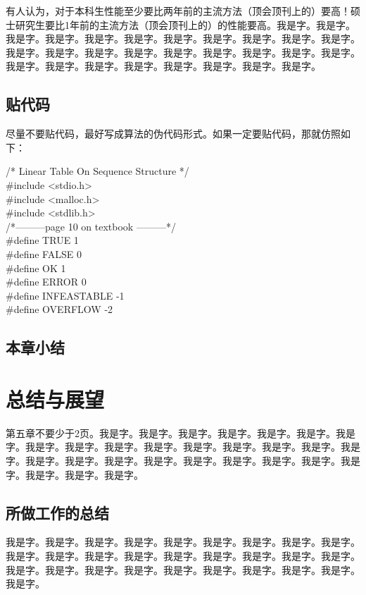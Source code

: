 \documentclass[supercite]{HustGraduPaper}
\theoremstyle{definition}
\begin{document}
有人认为，对于本科生性能至少要比两年前的主流方法（顶会顶刊上的）要高\cite{STR2021Neurocom}！硕士研究生要比1年前的主流方法（顶会顶刊上的）的性能要高。我是字。我是字。我是字。我是字。我是字。我是字。我是字。我是字。我是字。我是字。我是字。我是字。我是字。我是字。我是字。我是字。我是字。我是字。我是字。我是字。我是字。我是字。我是字。我是字。我是字。我是字。我是字。我是字。

\subsection{贴代码}

尽量不要贴代码，最好写成算法的伪代码形式。如果一定要贴代码，那就仿照如下：

\noindent
/* Linear Table On Sequence Structure */\\
\#include <stdio.h>\\
\#include <malloc.h>\\
\#include <stdlib.h>\\

\noindent
/*---------page 10 on textbook ---------*/\\
\#define TRUE 1\\
\#define FALSE 0\\
\#define OK 1\\
\#define ERROR 0\\
\#define INFEASTABLE -1\\
\#define OVERFLOW -2\\

\subsection{本章小结}

\newpage

\section{总结与展望}

第五章不要少于2页。我是字。我是字。我是字。我是字。我是字。我是字。我是字。我是字。我是字。我是字。我是字。我是字。我是字。我是字。我是字。我是字。我是字。我是字。我是字。我是字。我是字。我是字。我是字。我是字。我是字。我是字。我是字。我是字。

\subsection{所做工作的总结}

我是字。我是字。我是字。我是字。我是字。我是字。我是字。我是字。我是字。我是字。我是字。我是字。我是字。我是字。我是字。我是字。我是字。我是字。我是字。我是字。我是字。我是字。我是字。我是字。我是字。我是字。我是字。我是字。
\end{document}
